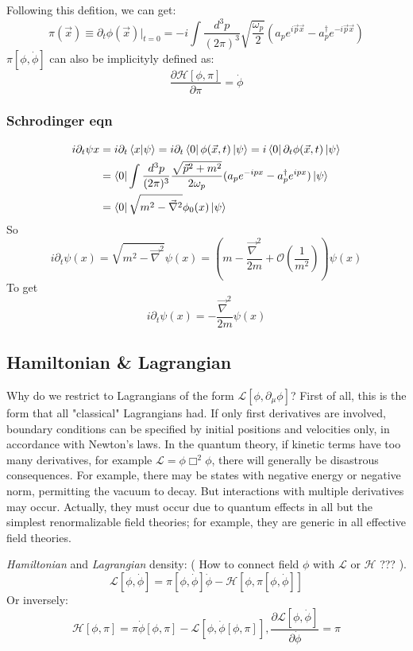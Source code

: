 Following this defition, we can get:
\[ \pi(\vec{x}) \equiv \partial_t \phi(\vec{x})|_{t=0} = 
-i \int \frac{d^{3}p}{(2\pi)^3} \sqrt{\frac{\omega_p}{2}}(a_pe^{i\vec{p}\vec{x}} - a_p^\dag e^{-i\vec{p}\vec{x}}) \]
$\pi[\phi, \dot{\phi}]$ can also be implicityly defined as:
\[ \frac{\partial \mathcal{H}[\phi, \pi ]}{\partial \pi } = \dot{\phi}\]

\subsubsection{Schrodinger eqn}
\[
    \begin{aligned}
	i\partial_t\psi{x}&=i\partial_t\bra{x}\ket{\psi}=i\partial_t\bra{0}\phi(\vec{x},t)\ket{\psi}=i\bra{0}\partial_t\phi(\vec{x},t)\ket{\psi}\\
	&=\bra{0}\int\frac{d^3p}{(2\pi)^3}\frac{\sqrt{\vec{p}^2+m^2}}{2\omega_p}(a_pe^{-ipx}-a^\dag_pe^{ipx})\ket{\psi}\\
	&=\bra{0}\sqrt{m^2-\vec{\nabla}^2}\phi_0(x)\ket{\psi}\\
    \end{aligned}
    \]
So
\[
    i\partial_t\psi(x)=\sqrt{m^2-\vec{\nabla}^2}\psi(x)=\left(m-\frac{\vec{\nabla}^2}{2m}+\mathcal{O}(\frac{1}{m^2})\right)\psi(x)
    \]
To get
\[
    i\partial_t\psi(x)=-\frac{\vec{\nabla}^2}{2m}\psi(x)
    \]
\subsection{Hamiltonian \& Lagrangian}
Why do we restrict to Lagrangians of the form $\mathcal{L}[\phi,
\partial_\mu \phi]$? First of all, this is the form that all "classical" 
Lagrangians had. If only first derivatives are involved, boundary 
conditions can be specified by initial positions and velocities only, in
accordance with Newton's laws. In the quantum theory, if kinetic terms 
have too many derivatives, for example $\mathcal{L} = \phi\Box^2\phi$, 
there will generally be disastrous consequences. For example, there may be
states with negative energy or negative norm, permitting the vacuum to decay. 
But interactions with multiple derivatives may occur. Actually, they must
occur due to quantum effects in all but the simplest renormalizable field
theories; for example, they are generic in all effective field theories.

\emph{Hamiltonian} and \emph{Lagrangian} density: ( How to connect field
$\phi$ with $\mathcal{L}$ or $\mathcal{H}$ ??? ).
\[ \mathcal{L}[\phi,\dot{\phi}] = \pi[\phi, \dot{\phi}]\dot{\phi} -
\mathcal{H}[\phi, \pi[\phi, \dot{\phi}]]  \]
Or inversely:
\[ \mathcal{H}[\phi,\pi] = \pi\dot{\phi}[\phi, \pi] -
\mathcal{L}[\phi, \dot{\phi}[\phi, \pi]],   
\frac{\partial \mathcal{L}[\phi, \dot{\phi}]}{\partial \dot{\phi} } = \pi\]

